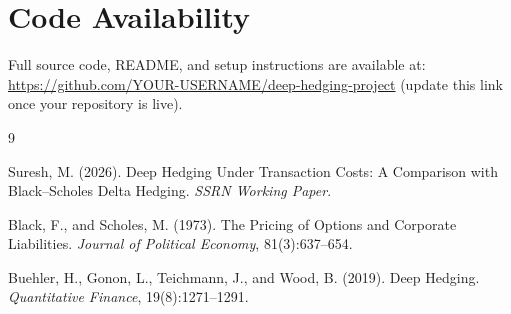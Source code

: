 \documentclass[11pt]{article}
\begin{document}
\section{Code Availability}
\label{sec:code}
Full source code, README, and setup instructions are available at:
\url{https://github.com/YOUR-USERNAME/deep-hedging-project}
(update this link once your repository is live).


\begin{thebibliography}{9}

Suresh, M. (2026). Deep Hedging Under Transaction Costs: A Comparison
with Black--Scholes Delta Hedging. \emph{SSRN Working Paper}.

Black, F., and Scholes, M. (1973). The Pricing of Options and Corporate
Liabilities. \emph{Journal of Political Economy}, 81(3):637--654.

Buehler, H., Gonon, L., Teichmann, J., and Wood, B. (2019). Deep Hedging.
\emph{Quantitative Finance}, 19(8):1271--1291.

\end{thebibliography}
\end{document}
